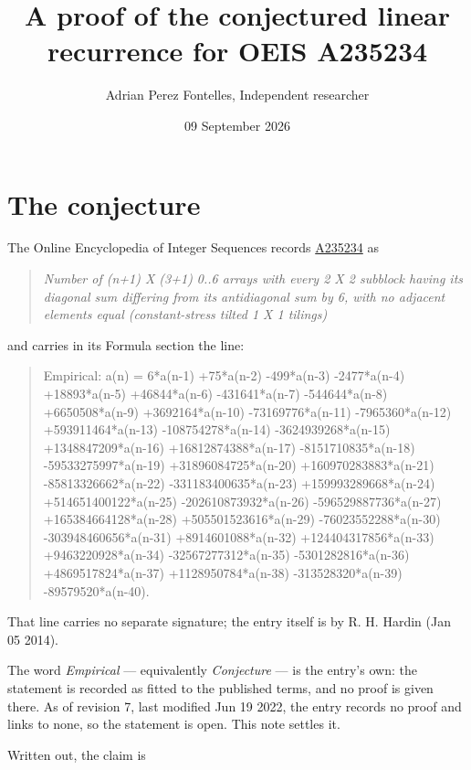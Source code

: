 \documentclass[11pt]{article}
\title{A proof of the conjectured linear recurrence for OEIS A235234}
\author{Adrian Perez Fontelles, Independent researcher}
\date{09 September 2026}
\theoremstyle{definition}
\begin{document}
\maketitle
\section{The conjecture}

The Online Encyclopedia of Integer Sequences records \href{https://oeis.org/A235234}{A235234} as

\begin{quote}\itshape Number of (n+1) X (3+1) 0..6 arrays with every 2 X 2 subblock having its diagonal sum differing from its antidiagonal sum by 6, with no adjacent elements equal (constant-stress tilted 1 X 1 tilings)\end{quote}

and carries in its Formula section the line:

\begin{quote}\ttfamily Empirical: a(n) = 6*a(n-1) +75*a(n-2) -499*a(n-3) -2477*a(n-4) +18893*a(n-5) +46844*a(n-6) -431641*a(n-7) -544644*a(n-8) +6650508*a(n-9) +3692164*a(n-10) -73169776*a(n-11) -7965360*a(n-12) +593911464*a(n-13) -108754278*a(n-14) -3624939268*a(n-15) +1348847209*a(n-16) +16812874388*a(n-17) -8151710835*a(n-18) -59533275997*a(n-19) +31896084725*a(n-20) +160970283883*a(n-21) -85813326662*a(n-22) -331183400635*a(n-23) +159993289668*a(n-24) +514651400122*a(n-25) -202610873932*a(n-26) -596529887736*a(n-27) +165384664128*a(n-28) +505501523616*a(n-29) -76023552288*a(n-30) -303948460656*a(n-31) +8914601088*a(n-32) +124404317856*a(n-33) +9463220928*a(n-34) -32567277312*a(n-35) -5301282816*a(n-36) +4869517824*a(n-37) +1128950784*a(n-38) -313528320*a(n-39) -89579520*a(n-40).\end{quote}

That line carries no separate signature; the entry itself is by R. H. Hardin (Jan 05 2014).

The word {\itshape Empirical} --- equivalently {\itshape Conjecture} --- is the entry's own: the statement is recorded as fitted to the published terms, and no proof is given there. As of revision 7, last modified Jun 19 2022, the entry records no proof and links to none, so the statement is open. This note settles it.

Written out, the claim is
\end{document}
